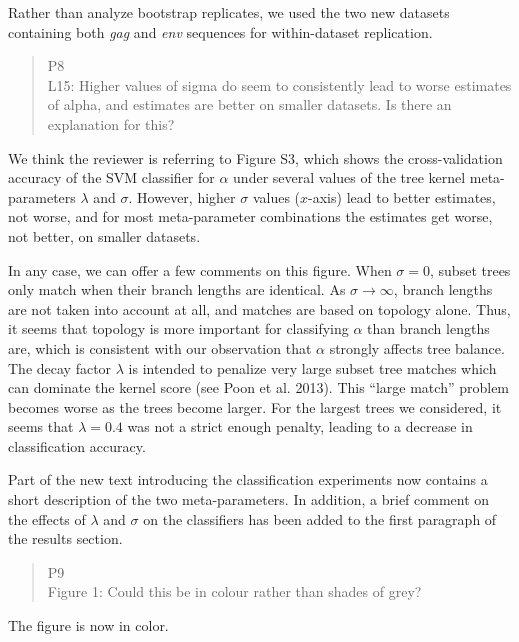 \documentclass[12pt]{letter}
\begin{document}
\begin{letter}{ }
Rather than analyze bootstrap replicates, we used the two new datasets
containing both \textit{gag} and \textit{env} sequences for within-dataset
replication.

\begin{quote}
  \itshape

  P8 \\
  L15: Higher values of sigma do seem to consistently lead to worse estimates
  of alpha, and estimates are better on smaller datasets. Is there an
  explanation for this?
\end{quote}

We think the reviewer is referring to Figure S3, which shows the
cross-validation accuracy of the SVM classifier for $\alpha$ under several
values of the tree kernel meta-parameters $\lambda$ and $\sigma$. However,
higher $\sigma$ values ($x$-axis) lead to better estimates, not worse, and for
most meta-parameter combinations the estimates get worse, not better, on
smaller datasets. 

In any case, we can offer a few comments on this figure. When $\sigma = 0$,
subset trees only match when their branch lengths are identical. As $\sigma \to
\infty$, branch lengths are not taken into account at all, and matches are
based on topology alone. Thus, it seems that topology is more important for
classifying $\alpha$ than branch lengths are, which is consistent with our
observation that $\alpha$ strongly affects tree balance. The decay factor
$\lambda$ is intended to penalize very large subset tree matches which can
dominate the kernel score (see Poon et al. 2013). This ``large match'' problem
becomes worse as the trees become larger. For the largest trees we considered, 
it seems that $\lambda = 0.4$ was not a strict enough penalty, leading to a
decrease in classification accuracy. 

Part of the new text introducing the classification experiments now contains a
short description of the two meta-parameters. In addition, a brief comment
on the effects of $\lambda$ and $\sigma$ on the classifiers has been added to
the first paragraph of the results section.

\begin{quote}
  \itshape

  P9 \\
  Figure 1: Could this be in colour rather than shades of grey?
\end{quote}

The figure is now in color.

\begin{quote}
  \itshape


\end{quote}
\end{letter}
\end{document}
